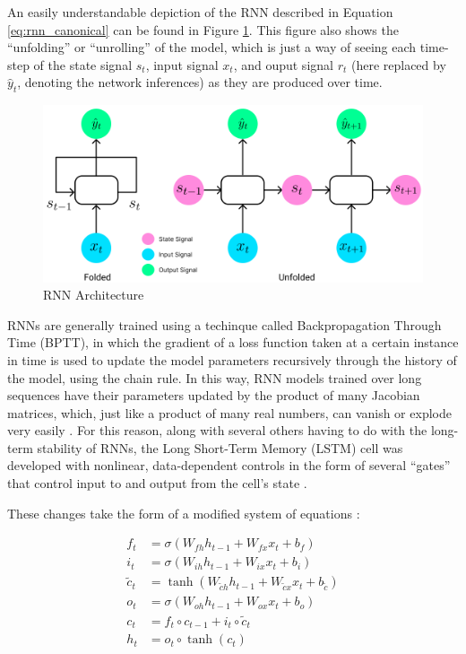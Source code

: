 \documentclass{scrartcl}
\begin{document}
An easily understandable depiction of the RNN described in Equation
\ref{eq:rnn_canonical} can be found in Figure \ref{fig:rnn_arch}. This figure
also shows the ``unfolding'' or ``unrolling'' of the model, which is just a way
of seeing each time-step of the state signal $s_t$, input signal
$x_t$, and ouput signal $r_t$ (here replaced by $\hat{y}_t$,
denoting the network inferences) as they are produced over time.

\begin{figure}[H]
	\begin{center}
		\includegraphics[width=1\textwidth]{figures/rnn_arch.png}
	\end{center}
	\caption{RNN Architecture}
	\label{fig:rnn_arch}
\end{figure}

RNNs are generally trained using a techinque called Backpropagation Through
Time (BPTT), in which the gradient of a loss function taken at a certain
instance in time is used to update the model parameters recursively through the
history of the model, using the chain rule. In this way, RNN models trained
over long sequences have their parameters updated by the product of many
Jacobian matrices, which, just like a product of many real numbers, can vanish
or explode very easily \cite{rnn_training_challenges}. For this reason, along
with several others having to do with the long-term stability of RNNs, the Long
Short-Term Memory (LSTM) cell was developed with nonlinear, data-dependent
controls in the form of several ``gates'' that control input to and output from 
the cell's state \cite{rnn_and_lstm_fundamentals}.

These changes take the form of a modified system of equations \cite{rnn_review}: 

\begin{equation}
	\begin{split}
		f_t & = \sigma (W_{fh} h_{t - 1} + W_{fx} x_t + b_f) \\
		i_t & = \sigma (W_{ih} h_{t - 1} + W_{ix} x_t + b_i) \\
		\tilde{c}_t & = \tanh (W_{\tilde{c} h} h_{t - 1} + W_{\tilde{c} x} x_t + b_\tilde{c}) \\
		o_t & = \sigma (W_{oh} h_{t - 1} + W_{ox} x_t + b_o) \\
		c_t & = f_t \circ c_{t - 1} + i_t \circ \tilde{c}_t \\
		h_t & = o_t \circ \tanh (c_t)
	\end{split}
	\label{eq:lstm_canonical}
\end{equation}
\end{document}

